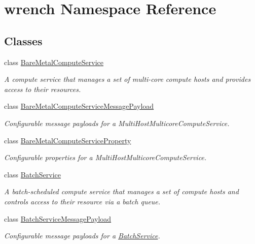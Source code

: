 \hypertarget{namespacewrench}{}\section{wrench Namespace Reference}
\label{namespacewrench}
\subsection*{Classes}
\begin{DoxyCompactItemize}
\item 
class \hyperlink{classwrench_1_1_bare_metal_compute_service}{Bare\+Metal\+Compute\+Service}
\begin{DoxyCompactList}\small\item\em A compute service that manages a set of multi-\/core compute hosts and provides access to their resources. \end{DoxyCompactList}\item 
class \hyperlink{classwrench_1_1_bare_metal_compute_service_message_payload}{Bare\+Metal\+Compute\+Service\+Message\+Payload}
\begin{DoxyCompactList}\small\item\em Configurable message payloads for a Multi\+Host\+Multicore\+Compute\+Service. \end{DoxyCompactList}\item 
class \hyperlink{classwrench_1_1_bare_metal_compute_service_property}{Bare\+Metal\+Compute\+Service\+Property}
\begin{DoxyCompactList}\small\item\em Configurable properties for a Multi\+Host\+Multicore\+Compute\+Service. \end{DoxyCompactList}\item 
class \hyperlink{classwrench_1_1_batch_service}{Batch\+Service}
\begin{DoxyCompactList}\small\item\em A batch-\/scheduled compute service that manages a set of compute hosts and controls access to their resource via a batch queue. \end{DoxyCompactList}\item 
class \hyperlink{classwrench_1_1_batch_service_message_payload}{Batch\+Service\+Message\+Payload}
\begin{DoxyCompactList}\small\item\em Configurable message payloads for a \hyperlink{classwrench_1_1_batch_service}{Batch\+Service}. \end{DoxyCompactList}\item 

\end{DoxyCompactItemize}
